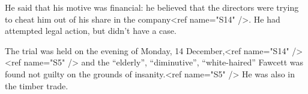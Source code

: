 He said that his motive was financial: he believed that the directors were trying to cheat him out of his share in the company\cite{DoubleMurder}<ref name="S14" />.  He had attempted legal action, but didn't have a case.\cite{DoubleMurder}

The trial was held on the evening of Monday, 14 December,<ref name="S14" /><ref name="S5" /> and the ``elderly'', ``diminutive'', ``white-haired''\cite{NewAngle} Fawcett was found not guilty on the grounds of insanity.<ref name="S5" />  He was also in the timber trade.\cite{FawcettRemanded}
